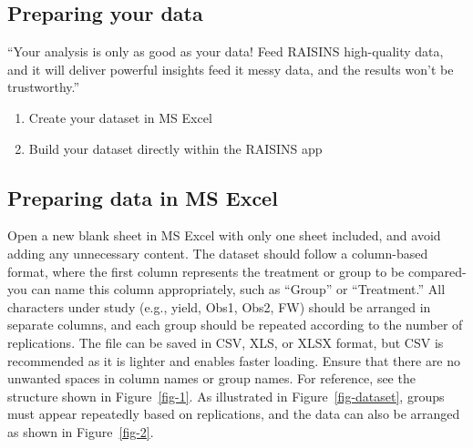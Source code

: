 \documentclass[
  letterpaper,
  DIV=11,
  numbers=noendperiod]{scrartcl}
\begin{document}
\hypertarget{sec-preparing}{%
\subsection{Preparing your data}\label{sec-preparing}}

``Your analysis is only as good as your data! Feed RAISINS high-quality
data, and it will deliver powerful insights feed it messy data, and the
results won't be trustworthy.''

\begin{enumerate}
\def\labelenumi{\arabic{enumi}.}
\item
  Create your dataset in MS Excel
\item
  Build your dataset directly within the RAISINS app
\end{enumerate}

\hypertarget{sec-MSEXCEL}{%
\subsection{Preparing data in MS Excel}\label{sec-MSEXCEL}}

Open a new blank sheet in MS Excel with only one sheet included, and
avoid adding any unnecessary content. The dataset should follow a
column-based format, where the first column represents the treatment or
group to be compared-you can name this column appropriately, such as
``Group'' or ``Treatment.'' All characters under study (e.g., yield,
Obs1, Obs2, FW) should be arranged in separate columns, and each group
should be repeated according to the number of replications. The file can
be saved in CSV, XLS, or XLSX format, but CSV is recommended as it is
lighter and enables faster loading. Ensure that there are no unwanted
spaces in column names or group names. For reference, see the structure
shown in Figure~\ref{fig-1}. As illustrated in Figure~\ref{fig-dataset},
groups must appear repeatedly based on replications, and the data can
also be arranged as shown in Figure~\ref{fig-2}.
\end{document}
